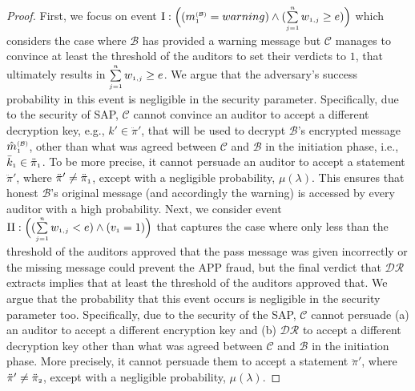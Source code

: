 \begin{proof}
 First, we focus on event $\text{\MakeUppercase{\romannumeral 1}}:  \Big((m^{\st\mathcal{(B)}}_{\st1}=warning) \wedge (\sum\limits_{\st j=1}^{\st n}w_{\st 1,j}\geq {e})\Big)$ which considers the case where $\mathcal{B}$ has provided a warning message but $\mathcal{C}$ manages to  convince at least the threshold of the auditors to set their verdicts to $1$,  that ultimately results in $\sum\limits_{\scriptscriptstyle j=1}^{\scriptscriptstyle n}w_{\scriptscriptstyle 1,j}\geq e$. We argue that the adversary's success probability in this event is negligible  in the security parameter. Specifically, due to the security of SAP, $\mathcal{C}$ cannot convince an auditor to accept a different decryption key, e.g., $k'\in \ddot\pi'$, that will be used to decrypt $\mathcal{B}$'s encrypted message $\hat {m}^{\scriptscriptstyle(\mathcal {B})}_{\scriptscriptstyle 1}$, other than what was agreed between $\mathcal{C}$ and $\mathcal{B}$ in the initiation phase, i.e., $\bar k_{\scriptscriptstyle 1}\in \ddot \pi_{\scriptscriptstyle 1}$.  To be more precise, it cannot persuade an auditor to accept a statement $\ddot \pi'$, where $\ddot \pi'\neq \ddot \pi_{\scriptscriptstyle 1}$, except with a negligible probability, $\mu(\lambda)$. This ensures that  honest $\mathcal{B}$’s original message (and accordingly the warning) is accessed by every auditor with a high probability. Next, we consider event  $\text{\MakeUppercase{\romannumeral 2}}:  \Big((\sum\limits_{\st j=1}^{\st n}w_{\st 1,j}<{e}) \wedge ( {v}_{\st 1}=1)\Big)$ that captures the case where only less than the  threshold of the auditors approved that the pass message was given incorrectly or the missing message could  prevent the APP fraud, but the final verdict that $\mathcal{DR}$ extracts implies that at least the threshold of the auditors approved that. We argue that the probability that this event occurs is negligible in the security parameter too. Specifically, due to the security of the SAP,  $\mathcal{C}$ cannot persuade (a)  an auditor to accept a different encryption key and (b) $\mathcal{DR}$ to accept a different decryption key other than what was agreed between $\mathcal{C}$ and $\mathcal{B}$ in the initiation phase. More precisely, it cannot persuade them to accept a statement $\ddot \pi'$, where $\ddot \pi'\neq \ddot \pi_{\scriptscriptstyle 2}$, except with a negligible probability, $\mu(\lambda)$. %
 

\end{proof}

